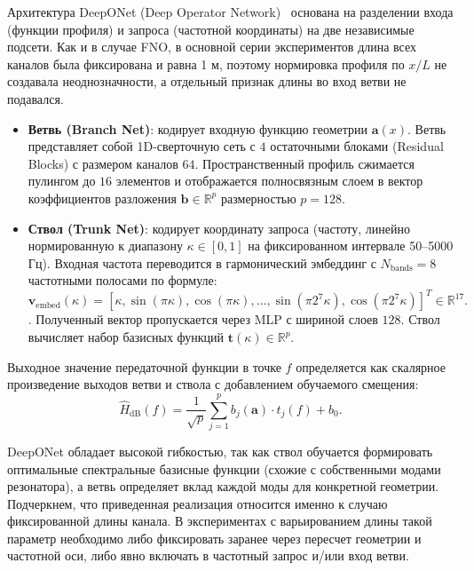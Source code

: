 Архитектура DeepONet (Deep Operator Network)~\cite{lu2021learning} основана на разделении входа (функции профиля) и запроса (частотной координаты) на две независимые подсети. Как и в случае FNO, в основной серии экспериментов длина всех каналов была фиксирована и равна 1 м, поэтому нормировка профиля по $x/L$ не создавала неоднозначности, а отдельный признак длины во вход ветви не подавался.
\begin{itemize}
    \item \textbf{Ветвь (Branch Net)}: кодирует входную функцию геометрии $\mathbf{a}(x)$. Ветвь представляет собой 1D-сверточную сеть с $4$ остаточными блоками (Residual Blocks) с размером каналов $64$. Пространственный профиль сжимается пулингом до $16$ элементов и отображается полносвязным слоем в вектор коэффициентов разложения $\mathbf{b} \in \mathbb{R}^{p}$ размерностью $p = 128$.
    \item \textbf{Ствол (Trunk Net)}: кодирует координату запроса (частоту, линейно нормированную к диапазону $\kappa \in [0, 1]$ на фиксированном интервале 50--5000 Гц). Входная частота переводится в гармонический эмбеддинг с $N_{\mathrm{bands}} = 8$ частотными полосами по формуле:
    \begin{equation}
        \mathbf{v}_{\mathrm{embed}}(\kappa) = \left[ \kappa, \sin(\pi \kappa), \cos(\pi \kappa), \dots, \sin(\pi 2^7 \kappa), \cos(\pi 2^7 \kappa) \right]^T \in \mathbb{R}^{17}.
    \end{equation}.
    Полученный вектор пропускается через MLP с шириной слоев $128$. Ствол вычисляет набор базисных функций $\mathbf{t}(\kappa) \in \mathbb{R}^{p}$.
\end{itemize}

Выходное значение передаточной функции в точке $f$ определяется как скалярное произведение выходов ветви и ствола с добавлением обучаемого смещения:
\begin{equation}
    \widehat{H}_{\text{dB}}(f) = \frac{1}{\sqrt{p}} \sum_{j=1}^{p} b_j(\mathbf{a}) \cdot t_j(f) + b_0.
\end{equation}

DeepONet обладает высокой гибкостью, так как ствол обучается формировать оптимальные спектральные базисные функции (схожие с собственными модами резонатора), а ветвь определяет вклад каждой моды для конкретной геометрии. Подчеркнем, что приведенная реализация относится именно к случаю фиксированной длины канала. В экспериментах с варьированием длины такой параметр необходимо либо фиксировать заранее через пересчет геометрии и частотной оси, либо явно включать в частотный запрос и/или вход ветви.

